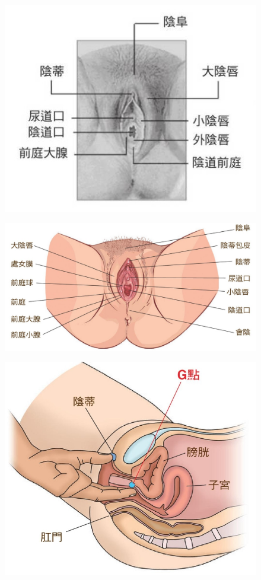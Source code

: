 \documentclass[12pt,UTF8]{ctexbook}
\begin{document}
\begin{figure}[H]
	\centering
	\includegraphics[width=0.7\linewidth]{2}
	\caption{}
	\label{fig:1}
\end{figure}

\begin{figure}[H]
	\centering
	\includegraphics[width=0.7\linewidth]{7}
	\caption{}
	\label{fig:1}
\end{figure}

\begin{figure}[H]
	\centering
	\includegraphics[width=0.7\linewidth]{8}
	\caption{}
	\label{fig:1}
\end{figure}
\end{document}
